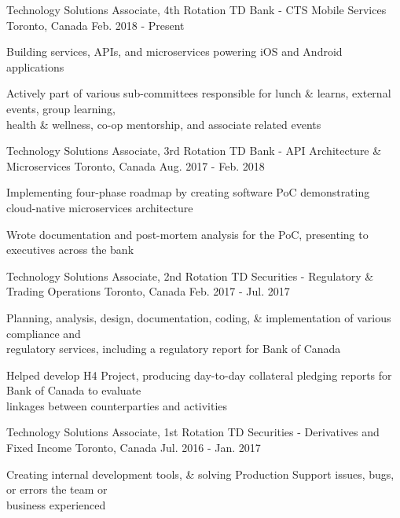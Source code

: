 \begin{cventries}
   \cventry
     {Technology Solutions Associate, 4th Rotation}
     {TD Bank - CTS Mobile Services}
     {Toronto, Canada}
     {Feb. 2018 - Present}
     {
      \begin{cvitems}
       \item {Building services, APIs, and microservices powering iOS and Android applications}
       \item {Actively part of various sub-committees responsible for lunch \& learns, external events, group learning, \\health \& wellness, co-op mentorship, and associate related events}
      \end{cvitems}
      }
	\cventry
     {Technology Solutions Associate, 3rd Rotation}
     {TD Bank - API Architecture \& Microservices}
     {Toronto, Canada}
     {Aug. 2017 - Feb. 2018}
     {
      \begin{cvitems}
       \item {Implementing four-phase roadmap by creating software PoC demonstrating cloud-native microservices architecture}
       \item {Wrote documentation and post-mortem analysis for the PoC, presenting to executives across the bank}
      \end{cvitems}
      }
   \cventry
    {Technology Solutions Associate, 2nd Rotation}
    {TD Securities - Regulatory \& Trading Operations}
    {Toronto, Canada}
    {Feb. 2017 - Jul. 2017}
    {
      \begin{cvitems}
        \item {Planning, analysis, design, documentation, coding, \& implementation of various compliance and \\regulatory services, including a regulatory report for Bank of Canada}
        \item {Helped develop H4 Project, producing day-to-day collateral pledging reports for Bank of Canada to evaluate \\linkages between counterparties and activities}
      \end{cvitems}
    }
  \cventry
    {Technology Solutions Associate, 1st Rotation}
    {TD Securities - Derivatives and Fixed Income}
    {Toronto, Canada}
    {Jul. 2016 - Jan. 2017}
    {
      \begin{cvitems}
        \item {Creating internal development tools, \& solving Production Support issues, bugs, or errors the team or \\business experienced}

\end{cvitems}}
\end{cventries}
